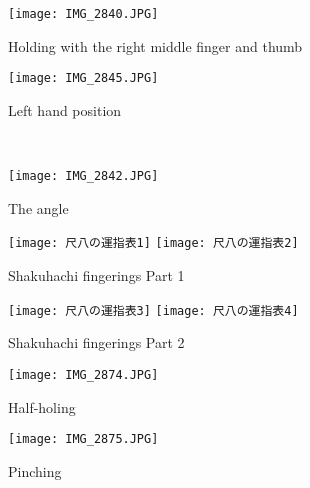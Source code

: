 
\begin{figure}[H]
	\centering
	\begin{minipage}{0.4\textwidth}
	\centering
	\texttt{[image: IMG\_2840.JPG]}
	\caption{Holding with the right middle finger and thumb}
	\label{fig:right_hand_position}
	\end{minipage}
	\hfill
	\begin{minipage}{0.4\textwidth}
	\centering
	\vspace{1cm}
	\texttt{[image: IMG\_2845.JPG]}
	\caption{Left hand position}
	\label{fig:left_hand_position}
	\end{minipage}
	\\
	\centering
	\begin{minipage}{0.4\textwidth}
	\centering
	\texttt{[image: IMG\_2842.JPG]}
	\caption{The angle}
	\label{fig:angle}
	\end{minipage}
	\hfill*

\end{figure}

\begin{figure}[H]
	\centering
	\texttt{[image: 尺八の運指表1]}
	\vspace{1cm}
	\texttt{[image: 尺八の運指表2]}
	\caption{Shakuhachi fingerings Part 1}
	\label{fig:shakuhachi_fingerings_1}
\end{figure}

\begin{figure}[H]
	\centering
	\texttt{[image: 尺八の運指表3]}
	\vspace{1cm}
	\texttt{[image: 尺八の運指表4]}
	\caption{Shakuhachi fingerings Part 2}
	\label{fig:shakuhachi_fingerings_2}
\end{figure}

\vfill

\begin{figure}
	\centering
	\begin{minipage}{0.4\textwidth}
	\centering
	\texttt{[image: IMG\_2874.JPG]}
	\caption{Half-holing} \label{fig:half-holing}
	\end{minipage}
	\hfill
	\begin{minipage}{0.4\textwidth}
	\texttt{[image: IMG\_2875.JPG]}
	\caption{Pinching} \label{fig:pinching}
	\end{minipage}
\end{figure}
